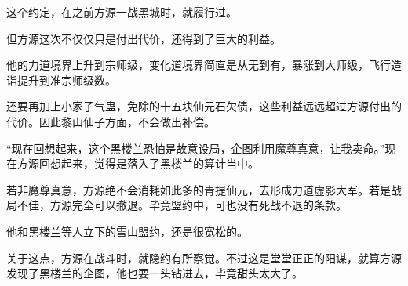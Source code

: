\begin{this_body}
这个约定，在之前方源一战黑城时，就履行过。

但方源这次不仅仅只是付出代价，还得到了巨大的利益。

他的力道境界上升到宗师级，变化道境界简直是从无到有，暴涨到大师级，飞行造诣提升到准宗师级数。

还要再加上小家子气蛊，免除的十五块仙元石欠债，这些利益远远超过方源付出的代价。因此黎山仙子方面，不会做出补偿。

“现在回想起来，这个黑楼兰恐怕是故意设局，企图利用魔尊真意，让我卖命。”现在方源回想起来，觉得是落入了黑楼兰的算计当中。

若非魔尊真意，方源绝不会消耗如此多的青提仙元，去形成力道虚影大军。若是战局不佳，方源完全可以撤退。毕竟盟约中，可也没有死战不退的条款。

他和黑楼兰等人立下的雪山盟约，还是很宽松的。

关于这点，方源在战斗时，就隐约有所察觉。不过这是堂堂正正的阳谋，就算方源发现了黑楼兰的企图，他也要一头钻进去，毕竟甜头太大了。

\end{this_body}

